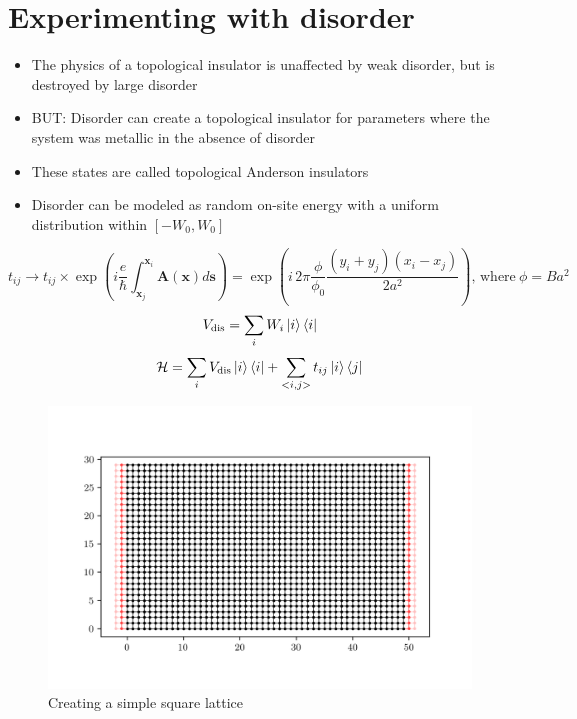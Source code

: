 \documentclass[12pt]{article}
\numberwithin{equation}{section}
\begin{document}
\section{Experimenting with disorder}
\begin{itemize}
  \item The physics of a topological insulator is unaffected by weak
  disorder, but is destroyed by large disorder
  \item BUT: Disorder can create a topological insulator for parameters where the system was metallic in 
  the absence of disorder
  \item These states are called topological Anderson insulators
  \item Disorder can be modeled as random on-site energy with a uniform distribution within $[-W_0, W_0]$
\end{itemize}

\newpage
\begin{equation*}
  t_{ij} \rightarrow t_{ij} \times \exp\left(i \frac{e}{\hbar} \int_{\mathbf{x}_j}^{\mathbf{x}_i} \mathbf{A}(\mathbf{x}) d\mathbf{s}\right)
  = \exp\left(i\, 2 \pi \frac{\phi}{\phi_0} \frac{(y_i + y_j)(x_i-x_j)}{2a^2} \right) \textrm{, where}~\phi = B a^2
\end{equation*}
\begin{equation*}
  V_\text{dis} = \sum_i W_i \ket i \bra i
\end{equation*}
\begin{equation*}
  \mathcal H = \sum\limits_i V_{\textrm{dis}}\ket i \bra i + \sum\limits_{<i,j>} t_{ij} \ket i \bra j
\end{equation*}

\begin{figure}[h!]
  \begin{center}
  \includegraphics[height=0.55\textheight]{./media/square_lattice_W=30_L=50.png}
  \caption{Creating a simple square lattice}
  \end{center}
\end{figure}
\end{document}

